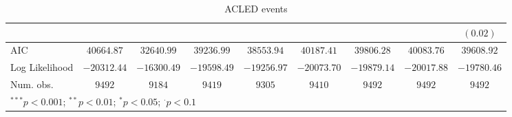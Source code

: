 \begin{sidewaystable}
\begin{center}
{\begin{tabular}{l c c c c c c c c}
                               &                &               &               &               &               &               &               & $(0.02)$      \\
\midrule
AIC                            & $40664.87$     & $32640.99$    & $39236.99$    & $38553.94$    & $40187.41$    & $39806.28$    & $40083.76$    & $39608.92$    \\
Log Likelihood                 & $-20312.44$    & $-16300.49$   & $-19598.49$   & $-19256.97$   & $-20073.70$   & $-19879.14$   & $-20017.88$   & $-19780.46$   \\
Num. obs.                      & $9492$         & $9184$        & $9419$        & $9305$        & $9410$        & $9492$        & $9492$        & $9492$        \\
\bottomrule
\multicolumn{9}{l}{\scriptsize{$^{***}p<0.001$; $^{**}p<0.01$; $^{*}p<0.05$; $^{\cdot}p<0.1$}}
\end{tabular}
}
\caption{ACLED
	       events}
\label{zacledev}
\end{center}
\end{sidewaystable}
